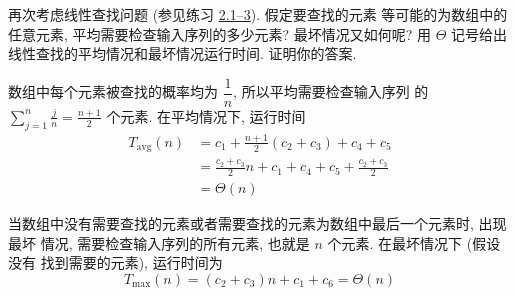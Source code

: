 \documentclass[boxes]{homework}
\begin{document}
\begin{problem}
再次考虑线性查找问题 (参见练习 \hyperref[prob:2.1-3]{2.1--3}). 假定要查找的元素
等可能的为数组中的任意元素, 平均需要检查输入序列的多少元素? 最坏情况又如何呢?
用 $\Theta$ 记号给出线性查找的平均情况和最坏情况运行时间. 证明你的答案.
\end{problem}
\begin{solution}
    数组中每个元素被查找的概率均为 $\dfrac{ 1 }{ n }$, 所以平均需要检查输入序列
    的 $\displaystyle \sum_{j = 1}^{n} \frac{ j }{ n } = \frac{ n + 1 }{ 2 }$
    个元素. 在平均情况下, 运行时间
    \begin{equation}
        \label{eq:3}
        \begin{aligned}
            T_{\mathrm{avg}}(n) & = c_{1} + \frac{ n + 1 }{ 2 } \left( c_{2} +
            c_{3}\right) + c_{4} + c_{5}                                       \\
                                & = \frac{ c_{2} + c_{3} }{ 2 } n + c_{1} +
            c_{4} + c_{5} + \frac{ c_{2} + c_{3} }{ 2 }                        \\
                                & = \Theta(n)
        \end{aligned}
    \end{equation}

    当数组中没有需要查找的元素或者需要查找的元素为数组中最后一个元素时, 出现最坏
    情况, 需要检查输入序列的所有元素, 也就是 $n$ 个元素. 在最坏情况下 (假设没有
    找到需要的元素), 运行时间为
    \begin{equation}
        \label{eq:4}
        T_{\max}(n) = \left( c_{2} + c_{3} \right)n + c_{1} + c_{6} = \Theta(n)
    \end{equation}
\end{solution}
\end{document}
